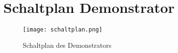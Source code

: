 \section{Schaltplan Demonstrator}
\label{sys_sec:Demonstrator_Aufbau}

\begin{figure}
\centering
\texttt{[image: schaltplan.png]}
\caption{Schaltplan des Demonstrators}
\end{figure}

